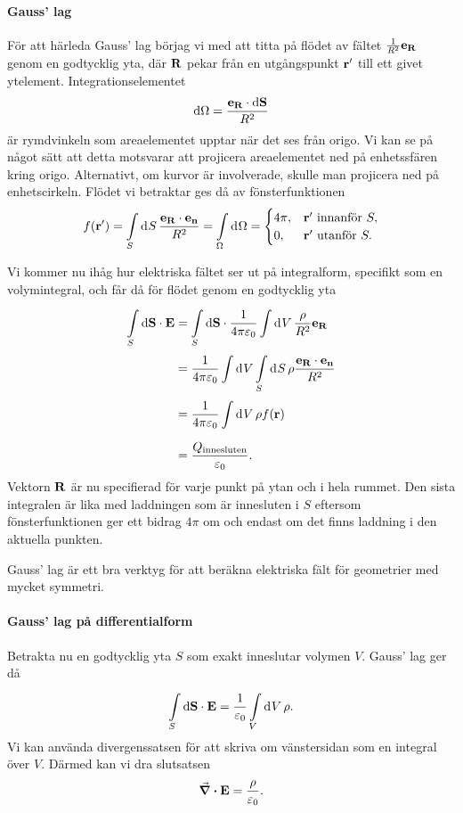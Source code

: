 \paragraph{Gauss' lag}
För att härleda Gauss' lag börjag vi med att titta på flödet av fältet $\frac{1}{R^{2}}\vb{e}_{\vb{R}}$ genom en godtycklig yta, där $\vb{R}$ pekar från en utgångspunkt $\vb{r}'$ till ett givet ytelement. Integrationselementet
\begin{align*}
	\dd{\Omega} = \frac{\vb{e}_{\vb{R}}\cdot\vb{\dd{S}}}{R^{2}}
\end{align*}
är rymdvinkeln som areaelementet upptar när det ses från origo. Vi kan se på något sätt att detta motsvarar att projicera areaelementet ned på enhetssfären kring origo. Alternativt, om kurvor är involverade, skulle man projicera ned på enhetscirkeln. Flödet vi betraktar ges då av fönsterfunktionen
\begin{align*}
	f(\vb{r}') = \int\limits_{S}^{}\dd[]{S}\frac{\vb{e}_{\vb{R}}\cdot\vb{e}_{\vb{n}}}{R^{2}} = \int\limits_{\Omega}^{}\dd[]{\Omega} =
	\begin{cases}
		4\pi, &\vb{r}'\text{ innanför }S, \\
		0,    &\vb{r}'\text{ utanför }S.
	\end{cases}
\end{align*}

Vi kommer nu ihåg hur elektriska fältet ser ut på integralform, specifikt som en volymintegral, och får då för flödet genom en godtycklig yta
\begin{align*}
	\int\limits_{S}^{}\dd{\vb{S}}\cdot \vb{E} &= \int\limits_{S}^{}\dd{\vb{S}}\cdot \frac{1}{4\pi\varepsilon_{0}}\int\limits_{}^{}\dd[]{V}\frac{\rho}{R^{2}}\vb{e}_{\vb{R}} \\
	                      &= \frac{1}{4\pi\varepsilon_{0}}\int\limits_{}^{}\dd[]{V}\int\limits_{S}^{}\dd[]{S}\rho\frac{\vb{e}_{\vb{R}}\cdot\vb{e}_{\vb{n}}}{R^{2}} \\
	                      &= \frac{1}{4\pi\varepsilon_{0}}\int\limits_{}^{}\dd[]{V}\rho f(\vb{r}) \\
	                      &= \frac{Q_{\text{innesluten}}}{\varepsilon_{0}}.
\end{align*}
Vektorn $\vb{R}$ är nu specifierad för varje punkt på ytan och i hela rummet. Den sista integralen är lika med laddningen som är innesluten i $S$ eftersom fönsterfunktionen ger ett bidrag $4\pi$ om och endast om det finns laddning i den aktuella punkten.

Gauss' lag är ett bra verktyg för att beräkna elektriska fält för geometrier med mycket symmetri.

\paragraph{Gauss' lag på differentialform}
Betrakta nu en godtycklig yta $S$ som exakt inneslutar volymen $V$. Gauss' lag ger då
\begin{align*}
	\int\limits_{S}^{}\dd{\vb{S}}\cdot \vb{E} = \frac{1}{\varepsilon_{0}}\int\limits_{V}^{}\dd[]{V}\rho.
\end{align*}
Vi kan använda divergenssatsen för att skriva om vänstersidan som en integral över $V$. Därmed kan vi dra slutsatsen
\begin{align*}
	\div{\vb{E}} = \frac{\rho}{\varepsilon_{0}}.
\end{align*}

